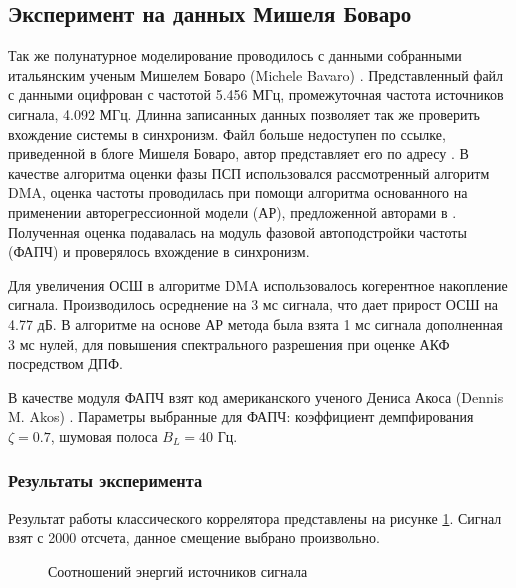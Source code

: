 \subsection{Эксперимент на данных Мишеля Боваро}

Так же полунатурное моделирование проводилось с данными собранными итальянским ученым Мишелем Боваро (Michele Bavaro) \cite{bovaro_blog}. Представленный файл с данными оцифрован
с частотой 5.456 МГц, промежуточная частота источников сигнала, 4.092 МГц. Длинна записанных данных позволяет так же проверить
вхождение системы в синхронизм. Файл больше недоступен по ссылке, приведенной в блоге Мишеля Боваро, автор представляет его по адресу \cite{rflab_primo}.
В качестве алгоритма оценки фазы ПСП использовался
рассмотренный алгоритм DMA, оценка частоты проводилась при помощи алгоритма основанного на применении авторегрессионной модели (АР), предложенной авторами в \cite{FIXME-otchet}.
Полученная оценка подавалась на модуль фазовой автоподстройки частоты (ФАПЧ) и проверялось вхождение в синхронизм.

Для увеличения ОСШ в алгоритме DMA использовалось когерентное накопление сигнала. Производилось осреднение на 3 мс сигнала, что дает прирост ОСШ на 4.77 дБ.
В алгоритме на основе АР метода была взята 1 мс сигнала дополненная 3 мс нулей, для повышения спектрального разрешения при оценке АКФ посредством ДПФ.

В качестве модуля ФАПЧ взят код американского ученого Дениса Акоса (Dennis M. Akos) \cite{sandiaproject}.
Параметры выбранные для ФАПЧ: коэффициент демпфирования ${\zeta=0.7}$, шумовая полоса  ${B_L=40}$ Гц. 

\subsubsection{Результаты эксперимента}

Результат работы классического коррелятора представлены на рисунке \ref{pic:5mhz_sats_all}. Сигнал взят с 2000 отсчета, данное смещение выбрано произвольно.
\begin{figure}[H]
\center{}
	\caption{Соотношений энергий источников сигнала}
	\label{pic:5mhz_sats_all}
\end{figure}

